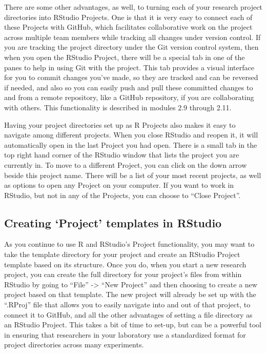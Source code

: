 \documentclass[]{tufte-book}
\begin{document}
There are some other advantages, as well, to turning each of your research
project directories into RStudio Projects. One is that it is very easy to
connect each of these Projects with GitHub, which facilitates collaborative work
on the project across multiple team members while tracking all changes under
version control. If you are tracking the project directory under the Git version
control system, then when you open the RStudio Project, there will be a special
tab in one of the panes to help in using Git with the project. This tab provides
a visual interface for you to commit changes you've made, so they are tracked
and can be reversed if needed, and also so you can easily push and pull these
committed changes to and from a remote repository, like a GitHub repository, if
you are collaborating with others. This functionality is described in modules
2.9 through 2.11.

Having your project directories set up as R Projects also makes it easy to
navigate among different projects. When you close RStudio and reopen it, it will
automatically open in the last Project you had open. There is a small tab in the
top right hand corner of the RStudio window that lists the project you are
currently in. To move to a different Project, you can click on the down arrow
beside this project name. There will be a list of your most recent projects, as
well as options to open any Project on your computer. If you want to work in
RStudio, but not in any of the Projects, you can choose to ``Close Project''.

\subsection{Creating `Project' templates in RStudio}\label{creating-project-templates-in-rstudio}

As you continue to use R and RStudio's Project functionality, you may want to
take the template directory for your project and create an RStudio Project
template based on its structure. Once you do, when you start a new research
project, you can create the full directory for your project's files from within
RStudio by going to ``File'' -\textgreater{} ``New Project'' and then choosing to create a new
project based on that template. The new project will already be set up with the
``.RProj'' file that allows you to easily navigate into and out of that project,
to connect it to GitHub, and all the other advantages of setting a file
directory as an RStudio Project. This takes a bit of time to set-up, but can
be a powerful tool in ensuring that researchers in your laboratory use a
standardized format for project directories across many experiments.
\end{document}
